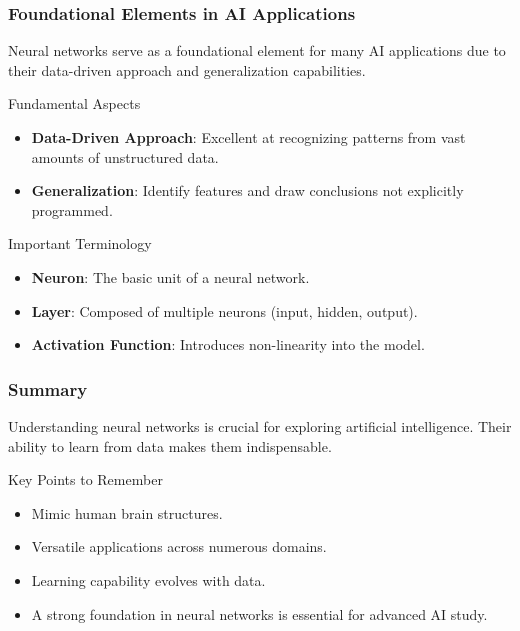\documentclass[aspectratio=169]{beamer}
\begin{document}
\begin{frame}[fragile]
    \frametitle{Foundational Elements in AI Applications}
    Neural networks serve as a foundational element for many AI applications due to their data-driven approach and generalization capabilities.

    \begin{block}{Fundamental Aspects}
        \begin{itemize}
            \item \textbf{Data-Driven Approach}: Excellent at recognizing patterns from vast amounts of unstructured data.
            \item \textbf{Generalization}: Identify features and draw conclusions not explicitly programmed.
        \end{itemize}
    \end{block}

    \begin{block}{Important Terminology}
        \begin{itemize}
            \item \textbf{Neuron}: The basic unit of a neural network.
            \item \textbf{Layer}: Composed of multiple neurons (input, hidden, output).
            \item \textbf{Activation Function}: Introduces non-linearity into the model.
        \end{itemize}
    \end{block}
\end{frame}

\begin{frame}[fragile]
    \frametitle{Summary}
    Understanding neural networks is crucial for exploring artificial intelligence. Their ability to learn from data makes them indispensable.

    \begin{block}{Key Points to Remember}
        \begin{itemize}
            \item Mimic human brain structures.
            \item Versatile applications across numerous domains.
            \item Learning capability evolves with data.
            \item A strong foundation in neural networks is essential for advanced AI study.
        \end{itemize}
    \end{block}
\end{frame}
\end{document}
